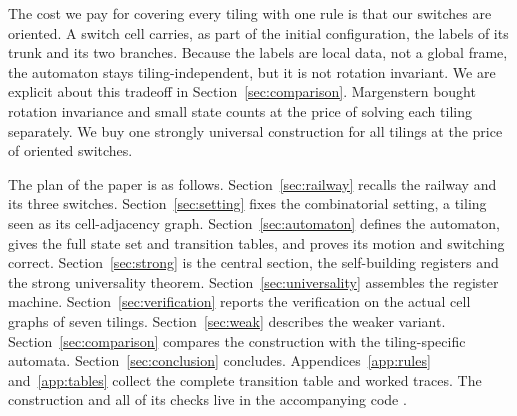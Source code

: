 The cost we pay for covering every tiling with one rule is that our switches are oriented. A switch cell
carries, as part of the initial configuration, the labels of its trunk and its two branches. Because the labels
are local data, not a global frame, the automaton stays tiling-independent, but it is not rotation invariant.
We are explicit about this tradeoff in Section~\ref{sec:comparison}. Margenstern bought rotation invariance and
small state counts at the price of solving each tiling separately. We buy one strongly universal construction
for all tilings at the price of oriented switches.

The plan of the paper is as follows. Section~\ref{sec:railway} recalls the railway and its three switches.
Section~\ref{sec:setting} fixes the combinatorial setting, a tiling seen as its cell-adjacency graph.
Section~\ref{sec:automaton} defines the automaton, gives the full state set and transition tables, and proves
its motion and switching correct. Section~\ref{sec:strong} is the central section, the self-building registers
and the strong universality theorem. Section~\ref{sec:universality} assembles the register machine.
Section~\ref{sec:verification} reports the verification on the actual cell graphs of seven tilings.
Section~\ref{sec:weak} describes the weaker variant. Section~\ref{sec:comparison} compares the construction with
the tiling-specific automata. Section~\ref{sec:conclusion} concludes. Appendices~\ref{app:rules} and~\ref{app:tables} collect the complete transition table and worked traces. The construction and all of its checks live in the accompanying code
\cite{pollard2026vibe}.
